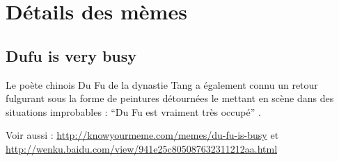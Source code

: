 \section{Détails des mèmes}
\label{sec:fullmemes}
\subsection{Dufu is very busy}



Le poète chinois Du Fu de la dynastie Tang a également connu un retour fulgurant sous la forme de peintures détournées le mettant en scène dans des situations improbables : ``Du Fu est vraiment très occupé'' . 


Voir aussi :
\url{http://knowyourmeme.com/memes/du-fu-is-busy}
et
\url{http://wenku.baidu.com/view/941e25c805087632311212aa.html}

